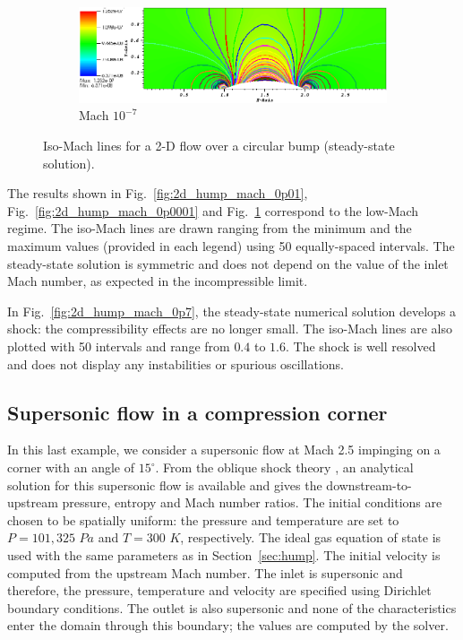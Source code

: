 \documentclass[preprint,10pt]{elsarticle}
\newcommand{\fig}[1]{Fig.~\ref{#1}}                      %
\newcommand{\sct}[1]{Section~\ref{#1}}                   %
\begin{document}
\begin{figure}[H]
        \begin{subfigure}[b]{0.495\textwidth}
                \centering
                \includegraphics[width=\textwidth]{Hump2D_mach_1em7.png}
                \caption{Mach $10^{-7}$}
                \label{fig:2d_hump_mach_0p0000001}
        \end{subfigure}
        \caption{Iso-Mach lines for a 2-D flow over a circular bump (steady-state solution).}
				\label{fig:2d_hump}
\end{figure}
%
The results shown in \fig{fig:2d_hump_mach_0p01}, \fig{fig:2d_hump_mach_0p0001} and \fig{fig:2d_hump_mach_0p0000001} 
correspond to the low-Mach regime. The iso-Mach lines are drawn ranging from the minimum and the maximum values 
(provided in each legend) using 50 equally-spaced intervals. The steady-state solution is symmetric and does not 
depend on the value of the inlet Mach number, as expected in the incompressible limit. 

In \fig{fig:2d_hump_mach_0p7}, the steady-state numerical solution develops a shock: the compressibility effects 
are no longer small. The iso-Mach lines are also plotted with 50 intervals and range from $0.4$ to $1.6$. 
The shock is well resolved and does not display any instabilities or spurious oscillations. 

\subsection{Supersonic flow in a compression corner} \label{sec:corner}

In this last example, we consider a supersonic flow at Mach 2.5 impinging on a corner with an angle of $15^\circ$. 
From the oblique shock theory \cite{CompressionCorner}, an analytical solution for this supersonic flow is available 
and gives the downstream-to-upstream pressure, entropy and Mach number ratios. 
The initial conditions are chosen to be spatially uniform: the pressure and temperature are set to $P=101,325$ $Pa$ 
and $T=300$ $K$, respectively.  The ideal gas equation of state is used with the same parameters as in \sct{sec:hump}. 
The initial velocity is computed from the upstream Mach number. The inlet is supersonic and therefore, the pressure, 
temperature and velocity are specified using Dirichlet boundary conditions. The outlet is also supersonic and none 
of the characteristics enter the domain through this boundary; the values are computed by the solver.
\end{document}
